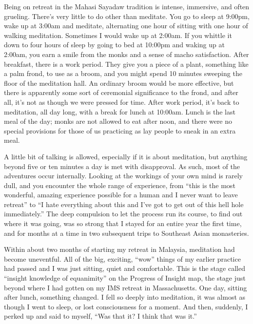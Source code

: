 \documentclass[a5paper,10pt,english]{book}
\begin{document}
\sphinxAtStartPar
Being on retreat in the Mahasi Sayadaw tradition is intense, immersive,
and often grueling. There’s very little to do other than meditate. You
go to sleep at 9:00pm, wake up at 3:00am and meditate, alternating one
hour of sitting with one hour of walking meditation. Sometimes I would
wake up at 2:00am. If you whittle it down to four hours of sleep by
going to bed at 10:00pm and waking up at 2:00am, you earn a smile from
the monks and a sense of macho satisfaction. After breakfast, there is a
work period. They give you a piece of a plant, something like a palm
frond, to use as a broom, and you might spend 10 minutes sweeping the
floor of the meditation hall. An ordinary broom would be more effective,
but there is apparently some sort of ceremonial significance to the
frond, and after all, it’s not as though we were pressed for time. After
work period, it’s back to meditation, all day long, with a break for
lunch at 10:00am. Lunch is the last meal of the day; monks are not
allowed to eat after noon, and there were no special provisions for
those of us practicing as lay people to sneak in an extra meal.

\sphinxAtStartPar
A little bit of talking is allowed, especially if it is about
meditation, but anything beyond five or ten minutes a day is met with
disapproval. As such, most of the adventures occur internally. Looking
at the workings of your own mind is rarely dull, and you encounter the
whole range of experience, from “this is the most wonderful, amazing
experience possible for a human and I never want to leave retreat” to “I
hate everything about this and I’ve got to get out of this hell hole
immediately.” The deep compulsion to let the process run its course, to
find out where it was going, was so strong that I stayed for an entire
year the first time, and for months at a time in two subsequent trips to
Southeast Asian monasteries.

\sphinxAtStartPar
Within about two months of starting my retreat in Malaysia, meditation
had become uneventful. All of the big, exciting, “wow” things of my
earlier practice had passed and I was just sitting, quiet and
comfortable. This is the stage called “insight knowledge of equanimity”
on the Progress of Insight map, the stage just beyond where I had gotten
on my IMS retreat in Massachusetts. One day, sitting after lunch,
something changed. I fell so deeply into meditation, it was almost as
though I went to sleep, or lost consciousness for a moment. And then,
suddenly, I perked up and said to myself, “Was that it? I think that was
it.”
\end{document}
